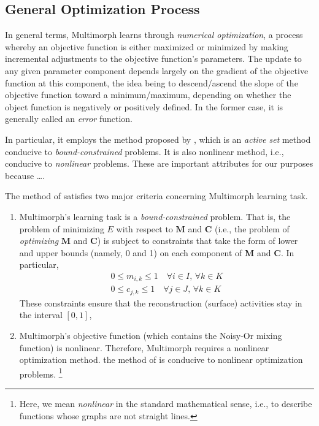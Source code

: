 \subsection{General Optimization Process}
\label{sec:num-opt}
In general terms, Multimorph learns through \emph{numerical optimization}, 
a process whereby an objective function is either maximized or minimized by 
making incremental adjustments to the objective function's parameters. The 
update to any given parameter component depends largely on the gradient 
of the objective function at this component, the idea being to descend/ascend 
the slope of the objective function toward a minimum/maximum, depending 
on whether the object function is negatively or positively defined. In the former case, 
it is generally called an \emph{error} function. 

In particular, it employs the method proposed by
\citet{cheng-and-li:2012}, which is an \emph{active set} method conducive to 
\emph{bound-constrained} problems. It is also nonlinear method, i.e., conducive to \emph{nonlinear} problems. 
These are important attributes for our purposes because \dots.

The method of \citet{cheng-and-li:2012} satisfies two major criteria concerning Multimorph
 learning task.
\begin{enumerate} 
\item Multimorph's learning task is a \emph{bound-constrained} problem. That is,
the problem of minimizing $E$ with respect to $\mathbf{M}$ and $\mathbf{C}$ (i.e., the problem of \emph{optimizing}  $\mathbf{M}$ and $\mathbf{C}$) is subject to constraints that take the form of 
lower and upper bounds (namely, 0 and 1) on each component of $\mathbf{M}$ and $\mathbf{C}$. In particular,
\begin{align}%
\label{eq:bounds-m}
0 \le m_{i,k} \le 1 \quad \text{$\forall i \in I$, $\forall k \in K$} \\
\label{eq:bounds-c}
0 \le c_{j,k} \le 1 \quad \text{$\forall j \in J$, $\forall k  \in K$}
\end{align}
These constraints ensure that the reconstruction (surface) activities stay in the interval $[0,1]$,
\item Multimorph's objective function (which contains the Noisy-Or mixing function) is nonlinear. Therefore, Multimorph requires a nonlinear optimization method. the method of \citet{cheng-and-li:2012} is conducive to nonlinear optimization problems. \footnote{Here, we mean \emph{nonlinear} in the standard mathematical sense, i.e., to describe functions whose graphs are not straight lines.} %
\end{enumerate}

